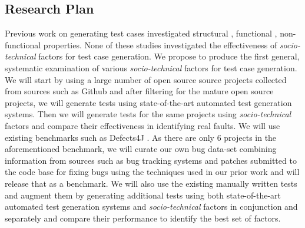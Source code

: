 \documentclass[10pt]{article}
\begin{document}
\subsection{Research Plan}

 Previous work on generating test cases investigated structural \cite{tonella2004evolutionary}, functional \cite{wegener2004evaluation}, non-functional \cite{wegener1998verifying} properties. %
None of these studies investigated the effectiveness of \emph{socio-technical} factors for test case generation. We propose to produce the first general, systematic examination of various \emph{socio-technical} factors for test case generation. We will start by using a large number of open source source projects collected from sources such as Github and after filtering for the mature open source projects, we will generate tests using state-of-the-art automated test generation systems. Then we will generate tests for the same projects using \emph{socio-technical} factors and compare their effectiveness in identifying real faults. We will use existing benchmarks such as Defects4J \cite{just2014defects4j}. As there are only 6 projects in the aforementioned benchmark, we will curate our own bug data-set combining information from  sources such as bug tracking systems and patches submitted to the code base for fixing bugs using the techniques used in our prior work \cite{ahmed2016can} and will release that as a benchmark. 
We will also use the existing manually written tests and augment them by generating additional tests using both state-of-the-art automated test generation systems and \emph{socio-technical} factors in conjunction and separately and compare their performance to identify the best set of factors.
\end{document}
